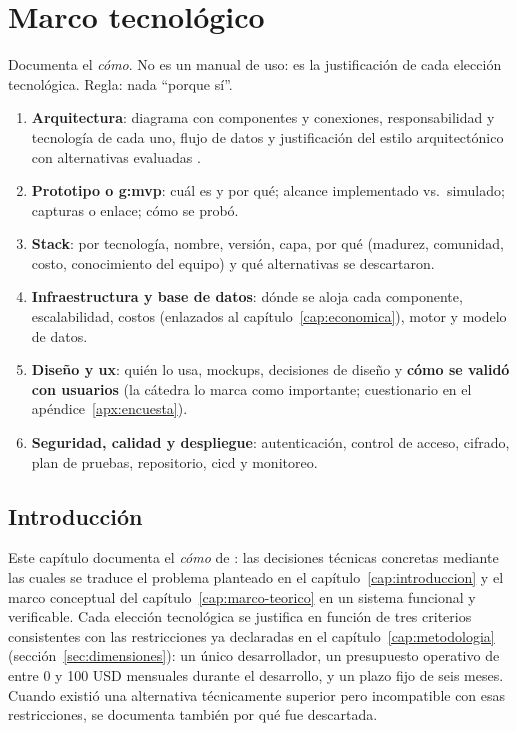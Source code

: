 
\chapter{Marco tecnológico}\label{cap:marco-tecnologico}

\begin{guia}
Documenta el \emph{cómo}. No es un manual de uso: es la justificación
de cada elección tecnológica. Regla: nada ``porque sí''.
\begin{enumerate}
    \item \textbf{Arquitectura}: diagrama con componentes y conexiones,
          responsabilidad y tecnología de cada uno, flujo de datos y
          justificación del estilo arquitectónico con alternativas
          evaluadas \citep{sommerville2016}.
    \item \textbf{Prototipo o \gls{g:mvp}}: cuál es y por qué; alcance
          implementado vs.\ simulado; capturas o enlace; cómo se probó.
    \item \textbf{Stack}: por tecnología, nombre, versión, capa, por qué
          (madurez, comunidad, costo, conocimiento del equipo) y qué
          alternativas se descartaron.
    \item \textbf{Infraestructura y base de datos}: dónde se aloja cada
          componente, escalabilidad, costos (enlazados al
          capítulo~\ref{cap:economica}), motor y modelo de datos.
    \item \textbf{Diseño y \gls{ux}}: quién lo usa, mockups, decisiones de
          diseño y \textbf{cómo se validó con usuarios} (la cátedra lo marca
          como importante; cuestionario en el apéndice~\ref{apx:encuesta}).
    \item \textbf{Seguridad, calidad y despliegue}: autenticación, control
          de acceso, cifrado, plan de pruebas, repositorio, \gls{cicd} y
          monitoreo.
\end{enumerate}
\end{guia}

\section{Introducción}

Este capítulo documenta el \emph{cómo} de \sistema{}: las decisiones
técnicas concretas mediante las cuales se traduce el problema planteado
en el capítulo~\ref{cap:introduccion} y el marco conceptual del
capítulo~\ref{cap:marco-teorico} en un sistema funcional y verificable.
Cada elección tecnológica se justifica en función de tres criterios
consistentes con las restricciones ya declaradas en el
capítulo~\ref{cap:metodologia} (sección~\ref{sec:dimensiones}): un único
desarrollador, un presupuesto operativo de entre 0 y 100 USD mensuales
durante el desarrollo, y un plazo fijo de seis meses. Cuando existió una
alternativa técnicamente superior pero incompatible con esas
restricciones, se documenta también por qué fue descartada.

